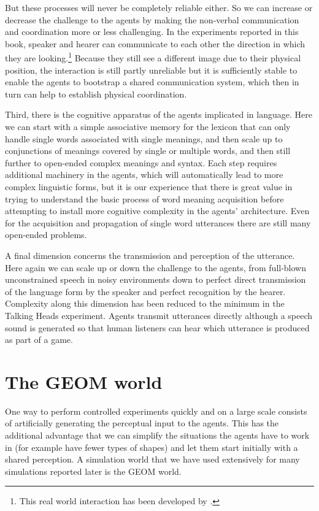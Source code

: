 But these processes will never be completely 
reliable either. So we can increase or decrease the challenge
to the agents by making the non-verbal communication and 
coordination more or less challenging. In the experiments 
reported in this book, speaker and hearer can communicate to each 
other the direction in which they 
are looking.\footnote{
This real world interaction has been developed 
by \cite{Kaplan:1999}.}
Because they still see a 
different image due to their physical position, the 
interaction is still partly unreliable but it is sufficiently stable 
to enable the agents to bootstrap a shared communication
system, which then in turn can help to establish 
physical coordination. 

Third, there is the cognitive apparatus of the agents
implicated in language. Here we can start with a simple 
associative memory for the lexicon 
that can only handle single words
associated with single meanings, and then scale up to 
conjunctions of meanings covered by single or
multiple words, and then still further to open-ended
complex meanings and syntax. 
Each step requires additional machinery in the agents, 
which will automatically lead to more complex linguistic
forms, but it is our experience that there is great value in
trying to understand the basic process of word 
meaning acquisition before attempting to install more 
cognitive complexity in the agents' architecture. Even for the
acquisition and propagation of single word utterances there are 
still many open-ended problems. 

A final dimension concerns the transmission and 
perception of the utterance. Here again we can scale
up or down the challenge to the agents, from full-blown 
unconstrained speech in noisy environments down to perfect direct
transmission of the language form by the 
speaker and perfect recognition by the hearer. 
Complexity along this dimension has been reduced to 
the minimum in the Talking Heads experiment. Agents 
transmit utterances directly although a speech sound
is generated so that human listeners can hear which
utterance is produced as part of a game. 

\section{The GEOM world}

One way to perform controlled experiments 
quickly and on a large scale consists of artificially 
generating the perceptual input to the agents. 
This has the additional advantage that we can 
simplify the situations the agents have to work in
(for example have fewer types of shapes) 
and let them start initially with a shared perception. A 
simulation world that we have used extensively 
for many simulations reported later 
is the GEOM world. 

